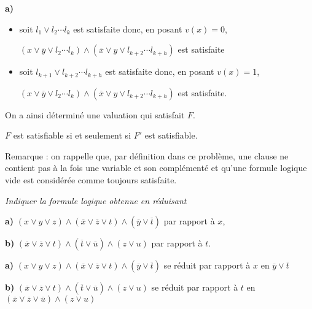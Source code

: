 \begin{Answer}{\bf a)}
\begin{itemize}
\begin{itemize}
  \item soit $l_1 \lor l_2 \cdots l_k$ est satisfaite donc, en posant $v(x)=0$,
  
  $(x\lor \overline y \lor l_2 \cdots l_k) \land (\overline x\lor y \lor l_{k+2} \cdots l_{k+h})$ est satisfaite
  
  \item soit $l_{k+1} \lor l_{k+2} \cdots l_{k+h}$ est satisfaite donc, en posant $v(x)=1$,
  
  $(x\lor \overline y \lor l_2 \cdots l_k) \land (\overline x\lor y \lor l_{k+2} \cdots l_{k+h})$ est satisfaite.
\end{itemize}
On a ainsi déterminé une valuation qui satisfait $F$.
\end{itemize}

$F$ est satisfiable si et seulement si $F'$ est satisfiable.

\end{Answer}
Remarque : on rappelle que, par définition dans ce problème, une clause ne contient pas à la fois une variable et son complémenté et qu’une formule logique vide est considérée comme toujours satisfaite.
\begin{Exercise}\it
Indiquer la formule logique obtenue en réduisant 

{\bf a)} $(x \lor y \lor z) \land (\overline x \lor \overline z \lor t) \land (\overline y \lor \overline t)$ par rapport à $x$,

{\bf b)} $(\overline x \lor \overline z \lor t) \land (\overline t \lor \overline u) \land (z \lor u)$ par rapport à $t$.
\end{Exercise}
\begin{Answer}

{\bf a)} $(x \lor y \lor z)\land(\overline x \lor \overline z\lor t)\land(\overline y \lor \overline t)$ se réduit par rapport à $x$ en 
$\overline y \lor \overline t$

{\bf b)} $(\overline x \lor \overline z \lor t)\land(\overline t \lor \overline  u) \land(z \lor u)$ se réduit par rapport à $t$ en 
$(\overline x \lor \overline z \lor \overline  u) \land(z \lor u)$
\newpage
\end{Answer}
